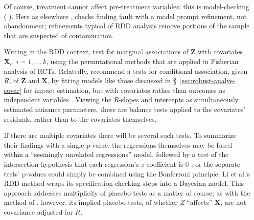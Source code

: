 Of course, treatment cannot affect pre-treatment variables; this is
model-checking (%
\citealp[][\S~5.13]{cox2006pos}%
).  Here as
 elsewhere \citep{box1980sab}, checks finding fault with a model prompt
 refinement, not abandonment; refinements typical of RDD analysis remove portions of
 the sample that are suspected of contamination.


 Writing in the RDD context, \citet{cattaneo2014randomization} test
 for marginal associations of $\mathbf{Z}$ with covariates $\mathbf{X}_{i}$,
 $i=1, \ldots, k$, using the permutational methods that are applied
 in Fisherian analysis of RCTs.
Relatedly, \citet{lee2010regression} recommend a
 tests for conditional association, given $R$, of $\mathbf{Z}$ and
 $\mathbf{X}$, by fitting models like those discussed in
 \S~\ref{sec:robust-analys-covar} for impact estimation, but with
 covariates rather than outcomes as independent variables%
. %
Viewing the $R$-slopes and intercepts as simultaneously estimated
 nuisance parameters, these are balance tests applied to
 the covariates' residuals, %
rather than to the covariates themselves.

If there are multiple
covariates there will be several such tests. To summarize their
findings with a single p-value, the
regressions themselves may be fused within a
``seemingly unrelated regressions'' model, followed by a test of the
intersection hypothesis that each regression's $z$-coefficient is 0
\citep{lee2010regression}, or the
separate tests' p-values could simply be combined using the Bonferroni
principle.  Li et al.'s
\citeyearpar{liMatteiMealli2015BayesianRD} RDD method wraps
its specification checking steps into a Bayesian model. %
This approach addresses multiplicity of placebo tests as a matter of course; as with the method of \citet{cattaneo2014randomization}, however, its implied placebo tests, of whether $Z$ ``affects'' $\mathbf{X}$, are not covariance adjusted for $R$.


